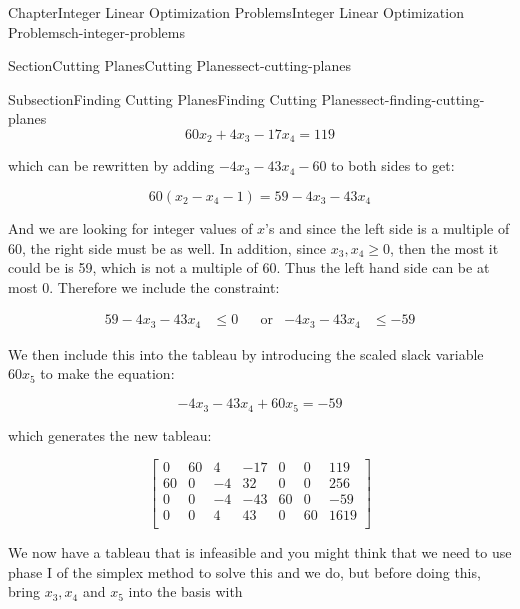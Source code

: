 \documentclass[oneside,10pt,]{book}
\numberwithin{equation}{section}
\newcommand{\amp}{&}
\begin{document}
\begin{chapterptx}{Chapter}{Integer Linear Optimization Problems}{}{Integer Linear Optimization Problems}{}{}{ch-integer-problems}
\begin{sectionptx}{Section}{Cutting Planes}{}{Cutting Planes}{}{}{sect-cutting-planes}
\begin{subsectionptx}{Subsection}{Finding Cutting Planes}{}{Finding Cutting Planes}{}{}{sect-finding-cutting-planes}
\begin{equation*}
60 x_{2} +4x_{3} -17 x_{4} = 119
\end{equation*}
%
\par
which can be rewritten by adding \(-4x_{3}-43x_{4}-60\) to both sides to get:%
\par
%
\begin{equation*}
60(x_{2} - x_{4} -1) = 59 - 4x_{3} -43x_{4}
\end{equation*}
%
\par
And we are looking for integer values of \(x\)’s and since the left side is a multiple of 60, the right side must be as well. In addition, since \(x_{3}, x_{4} \geq 0\), then the most it could be is 59, which is not a multiple of 60. Thus the left hand side can be at most 0. Therefore we include the constraint:%
\par
%
\begin{align*}
59-4x_{3}-43x_{4}\amp \leq 0 \amp \amp \text{or} \amp -4x_3 -43x_4 \amp \leq -59
\end{align*}
%
\par
We then include this into the tableau by introducing the scaled slack variable \(60x_{5}\) to make the equation:%
\par
%
\begin{equation*}
-4x_{3}-43x_{4} + 60x_{5}= - 59
\end{equation*}
%
\par
which generates the new tableau:%
\par
%
\begin{equation}
\left[\begin{array}{rr|rrrr|r} 0 \amp 60 \amp 4 \amp -17 \amp 0 \amp 0 \amp 119\\ 60 \amp 0 \amp -4 \amp 32 \amp 0 \amp 0 \amp 256\\ 0 \amp 0 \amp -4 \amp -43 \amp 60 \amp 0 \amp -59\\ \hline 0 \amp 0 \amp 4 \amp 43 \amp 0 \amp 60 \amp 1619\\ \end{array} \right]\label{eq-gomory-ex-1}
\end{equation}
%
\par
We now have a tableau that is infeasible and you might think that we need to use phase I of the simplex method to solve this and we do, but before doing this, bring \(x_{3}, x_{4}\) and \(x_{5}\) into the basis with%
\par
%
\begin{equation}

\end{equation}
\end{subsectionptx}
\end{sectionptx}
\end{chapterptx}
\end{document}
